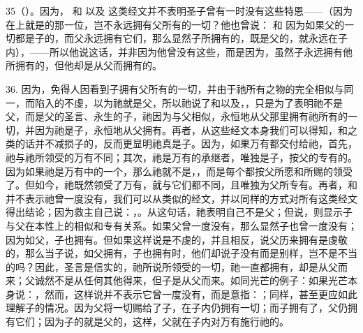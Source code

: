 35（）。因为， 和  以及  这类经文并不表明圣子曾有一时没有这些特恩——（因为在上就是的那一位，岂不永远拥有父所有的一切？他也曾说： 和  因为如果父的一切都是子的，而父永远拥有它们，那么显然子所拥有的，既是父的，就永远在子内），——所以他说这话，并非因为他曾没有这些，而是因为，虽然子永远拥有他所拥有的，但他却是从父而拥有的。\par

36. 因为，免得人因看到子拥有父所有的一切，并由于祂所有之物的完全相似与同一，而陷入的不虔，以为祂就是父，所以祂说了和以及，，只是为了表明祂不是父，而是父的圣言、永生的子，祂因为与父相似，永恒地从父那里拥有祂所有的一切，并因为祂是子，永恒地从父拥有。再者，从这些经文本身我们可以得知，和之类的话并不减损子的，反而更显明祂真是子。因为，如果万有都交付给祂，首先，祂与祂所领受的万有不同；其次，祂是万有的承继者，唯独是子，按父的专有的。因为如果祂是万有中的一个，那么祂就不是，，而是每个都按父所愿和所赐的领受了。但如今，祂既然领受了万有，就与它们都不同，且唯独为父所专有。再者，和并不表示祂曾一度没有，我们可以从类似的经文，并以同样的方式对所有这类经文得出结论；因为救主自己说：，。从这句话，祂表明自己不是父；但说，则显示子与父在本性上的相似和专有关系。如果父曾一度没有，那么显然子也曾一度没有；因为如父，子也拥有。但如果这样说是不虔的，并且相反，说父历来拥有是虔敬的，那么当子说，如父拥有，子也拥有时，他们却说子没有而是别样，岂不是不当的吗？因此，圣言是信实的，祂所说所领受的一切，祂一直都拥有，却是从父而来；父诚然不是从任何其他得来，但子是从父而来。如同光芒的例子：如果光芒本身说：，然而，这样说并不表示它曾一度没有，而是意指：；同样，甚至更应如此理解子的情况。因为父将一切赐给了子，在子内仍拥有一切；而子拥有了，父仍拥有它们；因为子的就是父的，这样，父就在子内对万有施行祂的。\par

